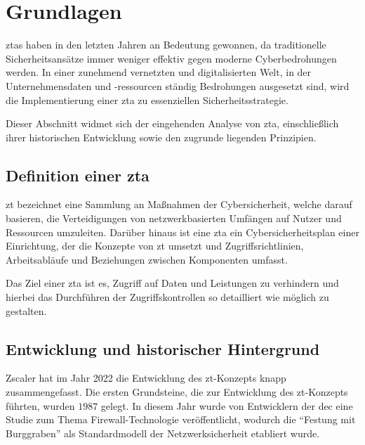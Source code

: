 \newpage


\section{Grundlagen}\label{sec:grundlagen}
\acp{zta} haben in den letzten Jahren an Bedeutung gewonnen, da traditionelle Sicherheitsansätze immer weniger effektiv gegen moderne Cyberbedrohungen werden.
In einer zunehmend vernetzten und digitalisierten Welt, in der Unternehmensdaten und -ressourcen ständig Bedrohungen ausgesetzt sind, wird die Implementierung einer \ac{zta} zu essenziellen Sicherheitsstrategie.

Dieser Abschnitt widmet sich der eingehenden Analyse von \ac{zta}, einschließlich ihrer historischen Entwicklung sowie den zugrunde liegenden Prinzipien.

\subsection[Definition einer Zero-Trust-Architektur]{Definition einer \ac{zta}}\label{subsec:definition-einer-zta}
\ac{zt} bezeichnet eine Sammlung an Maßnahmen der Cybersicherheit, welche darauf basieren, die Verteidigungen von netzwerkbasierten Umfängen auf Nutzer und Ressourcen umzuleiten\autocite[\vglf][]{NIST:800207}.
Darüber hinaus ist eine \ac{zta} ein Cybersicherheitsplan einer Einrichtung, der die Konzepte von \ac{zt} umsetzt und Zugriffsrichtlinien, Arbeitsabläufe und Beziehungen zwischen Komponenten umfasst.\autocite[\vglf][]{NIST:800207}

Das Ziel einer \ac{zta} ist es,  Zugriff auf Daten und Leistungen zu verhindern und hierbei das Durchführen der Zugriffskontrollen so detailliert wie möglich zu gestalten.


\subsection{Entwicklung und historischer Hintergrund}\label{subsec:entwicklung-und-historischer-hintergrund}
Zscaler hat im Jahr 2022 die Entwicklung des \ac{zt}-Konzepts knapp zusammengefasst.\autocites[\vglf][]{zscaler-2022b}
Die ersten Grundsteine, die zur Entwicklung des \ac{zt}-Konzepts führten, wurden $1987$ gelegt.
In diesem Jahr wurde von Entwicklern der \ac{dec} eine Studie zum Thema Firewall-Technologie veröffentlicht, wodurch die \enquote{Festung mit Burggraben} als Standardmodell der Netzwerksicherheit etabliert wurde.\autocites[\vglf][]{zscaler-2022b}

